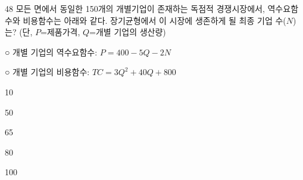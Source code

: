 \begin{question}{48}
모든 면에서 동일한 150개의 개별기업이 존재하는 독점적 경쟁시장에서, 역수요함수와 비용함수는 아래와 같다. 장기균형에서 이 시장에 생존하게 될 최종 기업 수($N$)는? (단, $P$=제품가격, $Q$=개별 기업의 생산량)
\begin{framedtext}
○ 개별 기업의 역수요함수: $P=400-5Q-2N$ \par
○ 개별 기업의 비용함수: $TC=3Q^{2}+40Q+800$ \par
\end{framedtext}
\begin{choices}
  \item 10
  \item 50
  \item 65
  \item 80
  \item 100
\end{choices}
\end{question}
